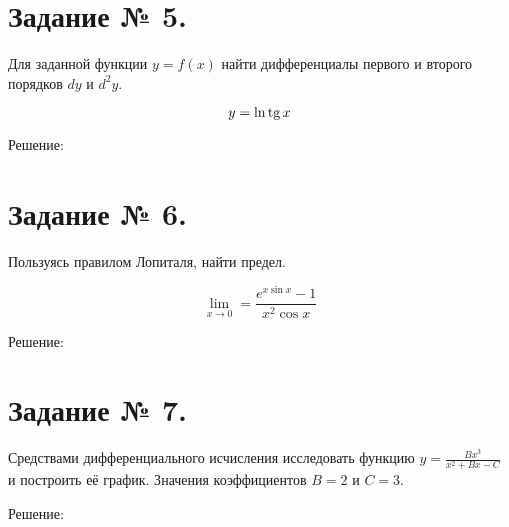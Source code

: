 \documentclass{article}
\newcommand{\tg}{\mathop{\rm tg}\nolimits}
\begin{document}
\section*{Задание № 5.}

Для заданной функции $y=f(x)$ найти дифференциалы первого и второго порядков $dy$ и $d^2y$.

$$y=\ln{\tg{x}}$$

\begin{center}Решение:\end{center}

\section*{Задание № 6.}

Пользуясь правилом Лопиталя, найти предел.

$$\lim_{x\to0}=\frac{e^{x\sin{x}}-1}{x^2\cos{x}}$$

\begin{center}Решение:\end{center}

\section*{Задание № 7.}

Средствами дифференциального исчисления исследовать функцию $y=\frac{Bx^3}{x^2+Bx-C}$ и построить её график. Значения коэффициентов $B=2$ и $C=3$.

\begin{center}Решение:\end{center}
\end{document}
